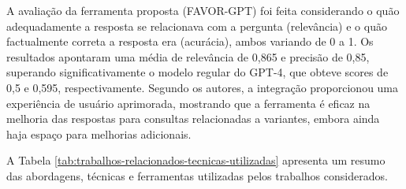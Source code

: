 A avaliação da ferramenta proposta (FAVOR-GPT) foi feita considerando o quão adequadamente a resposta se relacionava com a pergunta (relevância) e o quão factualmente correta a resposta era (acurácia), ambos variando de 0 a 1. Os resultados apontaram uma média de relevância de 0,865 e precisão de 0,85, superando significativamente o modelo regular do GPT-4, que obteve scores de 0,5 e 0,595, respectivamente. Segundo os autores, a integração proporcionou uma experiência de usuário aprimorada, mostrando que a ferramenta é eficaz na melhoria das respostas para consultas relacionadas a variantes, embora ainda haja espaço para melhorias adicionais.

A Tabela \ref{tab:trabalhos-relacionados-tecnicas-utilizadas} apresenta um resumo das abordagens, técnicas e ferramentas utilizadas pelos trabalhos considerados.

